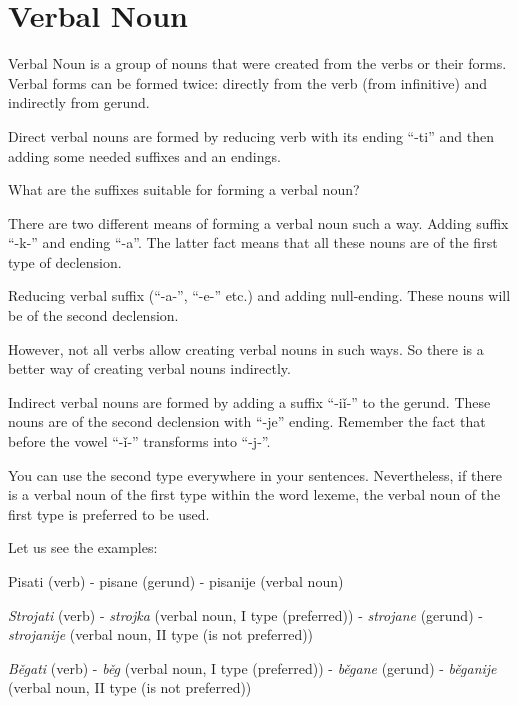 \section{Verbal Noun}

Verbal Noun is a group of nouns that were created from the verbs or their forms. Verbal forms can be formed twice: directly from the verb (from infinitive) and indirectly from gerund.

Direct verbal nouns are formed by reducing verb with its ending “-ti” and then adding some needed suffixes and an endings.

What are the suffixes suitable for forming a verbal noun? 

There are two different means of forming a verbal noun such a way.
Adding suffix “-k-” and ending “-a”. The latter fact means that all these nouns are of the first type of declension. 

Reducing verbal suffix (“-a-”,  “-e-” etc.) and adding null-ending. These nouns will be of the second declension.

However, not all verbs allow creating verbal nouns in such ways. So there is a better way of creating verbal nouns indirectly.

Indirect verbal nouns are formed by adding a suffix “-iǐ-” to the gerund. These nouns are of the second declension with “-je” ending. Remember the fact that before the vowel “-ǐ-” transforms into “-j-”. 

You can use the second type everywhere in your sentences. Nevertheless, if there is a verbal noun of the first type within the word lexeme, the verbal noun of the first type is preferred to be used.

Let us see the examples:

Pisati (verb) - pisane (gerund) - pisanije (verbal noun)

\textit{Strojati} (verb) - \textit{strojka} (verbal noun, I type (preferred)) - \textit{strojane} (gerund) - \textit{strojanije} (verbal noun, II type (is not preferred))

\textit{Běgati} (verb) - \textit{běg} (verbal noun, I type (preferred)) - \textit{běgane} (gerund) - \textit{běganije} (verbal noun, II type (is not preferred))  

